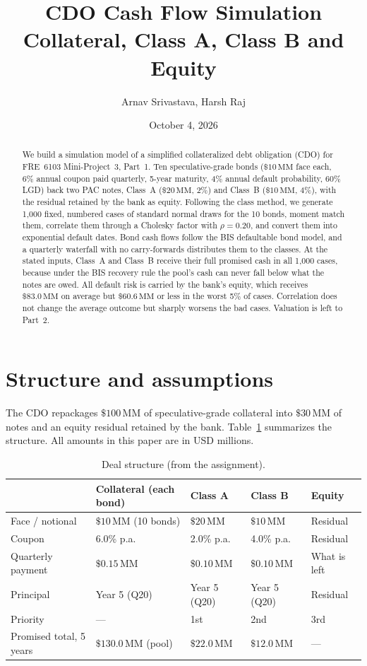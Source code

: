 \documentclass[11pt]{article}
\title{CDO Cash Flow Simulation\\[2pt] \large Collateral, Class A, Class B and Equity}
\author{Arnav Srivastava, Harsh Raj}
\date{October 4, 2026}
\newcommand{\MM}{\,\text{MM}}
\begin{document}
\maketitle

\begin{abstract}
\noindent
We build a simulation model of a simplified collateralized debt obligation (CDO) for FRE~6103 Mini-Project~3, Part~1.
Ten speculative-grade bonds ($\$10\MM$ face each, 6\% annual coupon paid quarterly, 5-year maturity, 4\% annual default probability, 60\% LGD)
back two PAC notes, Class~A ($\$20\MM$, 2\%) and Class~B ($\$10\MM$, 4\%), with the residual retained by the bank as equity.
Following the class method, we generate 1{,}000 fixed, numbered cases of standard normal draws for the 10 bonds, moment match them,
correlate them through a Cholesky factor with $\rho = 0.20$, and convert them into exponential default dates.
Bond cash flows follow the BIS defaultable bond model, and a quarterly waterfall with no carry-forwards distributes them to the classes.
At the stated inputs, Class~A and Class~B receive their full promised cash in all 1{,}000 cases, because under the BIS recovery rule
the pool's cash can never fall below what the notes are owed. All default risk is carried by the bank's equity, which receives
$\$83.0\MM$ on average but $\$60.6\MM$ or less in the worst 5\% of cases. Correlation does not change the average outcome but
sharply worsens the bad cases. Valuation is left to Part~2.
\end{abstract}

\section{Structure and assumptions}

The CDO repackages $\$100\MM$ of speculative-grade collateral into $\$30\MM$ of notes and an equity residual retained by the bank.
Table~\ref{tab:structure} summarizes the structure. All amounts in this paper are in USD millions.

\begin{table}[H]
\centering
\caption{Deal structure (from the assignment).}
\label{tab:structure}
\begin{tabular}{lllll}
\toprule
 & Collateral (each bond) & Class A & Class B & Equity \\
\midrule
Face / notional & $\$10\MM$ (10 bonds) & $\$20\MM$ & $\$10\MM$ & Residual \\
Coupon & 6.0\% p.a. & 2.0\% p.a. & 4.0\% p.a. & Residual \\
Quarterly payment & $\$0.15\MM$ & $\$0.10\MM$ & $\$0.10\MM$ & What is left \\
Principal & Year 5 (Q20) & Year 5 (Q20) & Year 5 (Q20) & Residual \\
Priority & --- & 1st & 2nd & 3rd \\
Promised total, 5 years & $\$130.0\MM$ (pool) & $\$22.0\MM$ & $\$12.0\MM$ & --- \\
\bottomrule
\end{tabular}
\end{table}
\end{document}
